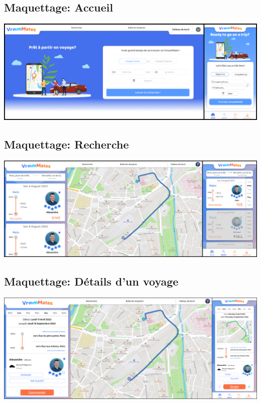 \begin{landscape}
\section{Maquettage: Accueil}
\label{Maquettage: Accueil}
\begin{center}
\includegraphics[width=\linewidth]{medias/accueil.png}
\end{center}
\end{landscape}

\begin{landscape}
\section{Maquettage: Recherche}
\label{Maquettage: Recherche}
\begin{center}
\includegraphics[width=\linewidth]{medias/recherche.png}
\end{center}
\end{landscape}

\begin{landscape}
\section{Maquettage: Détails d'un voyage}
\label{Maquettage: Détails d'un voyage}
\begin{center}
\includegraphics[width=\linewidth]{medias/details.png}
\end{center} 
\end{landscape}

